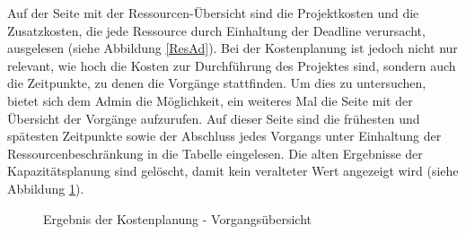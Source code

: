 \documentclass[a4paper,12pt,parskip,bibtotoc,liststotoc]{article}
\begin{document}
Auf der Seite mit der Ressourcen-Übersicht sind die Projektkosten und die Zusatzkosten, die jede Ressource durch Einhaltung der Deadline verursacht, ausgelesen (siehe Abbildung \ref{ResAd}). Bei der Kostenplanung ist jedoch nicht nur relevant, wie hoch die Kosten zur Durchführung des Projektes sind, sondern auch die Zeitpunkte, zu denen die Vorgänge stattfinden. Um dies zu untersuchen, bietet sich dem Admin die Möglichkeit, ein weiteres Mal die Seite mit der Übersicht der Vorgänge aufzurufen. Auf dieser Seite sind die frühesten und spätesten Zeitpunkte sowie der Abschluss jedes Vorgangs unter Einhaltung der Ressourcenbeschränkung in die Tabelle eingelesen. Die alten Ergebnisse der Kapazitätsplanung sind gelöscht, damit kein veralteter Wert angezeigt wird (siehe Abbildung \ref{VorKo}).\\  

\begin{figure}[h!]
  \begin{center}
    \caption{Ergebnis der Kostenplanung - Vorgangsübersicht}  \label{VorKo}
  \end{center}
\end{figure}
\end{document}
